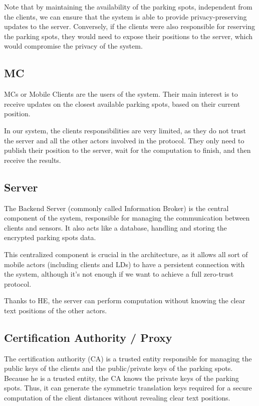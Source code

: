 Note that by maintaining the availability of the parking spots, independent from the clients, we can ensure that the system is able to provide privacy-preserving updates to the server. Conversely, if the clients were also responsible for reserving the parking spots, they would need to expose their positions to the server, which would compromise the privacy of the system.

\subsection{MC}
MCs or Mobile Clients are the users of the system. Their main interest is to receive updates on the closest available parking spots, based on their current position. 

In our system, the clients responsibilities are very limited, as they do not trust the server and all the other actors involved in the protocol. They only need to publish their position to the server, wait for the computation to finish, and then receive the results.

\subsection{Server}
The Backend Server (commonly called Information Broker) is the central component of the system, responsible for managing the communication between clients and sensors. It also acts like a database, handling and storing the encrypted parking spots data.

This centralized component is crucial in the architecture, as it allows all sort of mobile actors (including clients and LDs) to have a persistent connection with the system, although it's not enough if we want to achieve a full zero-trust protocol.

Thanks to HE, the server can perform computation without knowing the clear text positions of the other actors.

\subsection{Certification Authority / Proxy}
The certification authority (CA) is a trusted entity responsible for managing the public keys of the clients and the public/private keys of the parking spots. Because he is a trusted entity, the CA knows the private keys of the parking spots. Thus, it can generate the symmetric translation keys required for a secure computation of the client distances without revealing clear text positions.

